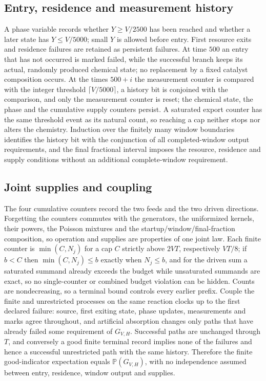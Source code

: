 \documentclass[11pt,a4paper]{article}
\theoremstyle{plain}
\theoremstyle{definition}
\theoremstyle{remark}
\newcommand{\Prob}{\mathbb P}
\newcommand{\Good}{G_{V,H}}
\begin{document}
\subsection{Entry, residence and measurement history}
A phase variable records whether $Y\ge V/2500$ has been reached and whether a later state has $Y\le V/5000$; small $Y$ is allowed before entry. First resource exits and residence failures are retained as persistent failures. At time $500$ an entry that has not occurred is marked failed, while the successful branch keeps its actual, randomly produced chemical state; no replacement by a fixed catalyst composition occurs. At the times $500+i$ the measurement counter is compared with the integer threshold $\lceil V/5000\rceil$, a history bit is conjoined with the comparison, and only the measurement counter is reset; the chemical state, the phase and the cumulative supply counters persist. A saturated export counter has the same threshold event as its natural count, so reaching a cap neither stops nor alters the chemistry. Induction over the finitely many window boundaries identifies the history bit with the conjunction of all completed-window output requirements, and the final fractional interval imposes the resource, residence and supply conditions without an additional complete-window requirement.

\subsection{Joint supplies and coupling}
The four cumulative counters record the two feeds and the two driven directions. Forgetting the counters commutes with the generators, the uniformized kernels, their powers, the Poisson mixtures and the startup/window/final-fraction composition, so operation and supplies are properties of one joint law. Each finite counter is $\min(C,N_j)$ for a cap $C$ strictly above $2VT$, respectively $VT/8$; if $b<C$ then $\min(C,N_j)\le b$ exactly when $N_j\le b$, and for the driven sum a saturated summand already exceeds the budget while unsaturated summands are exact, so no single-counter or combined budget violation can be hidden. Counts are nondecreasing, so a terminal bound controls every earlier prefix. Couple the finite and unrestricted processes on the same reaction clocks up to the first declared failure: source, first exiting state, phase updates, measurements and marks agree throughout, and artificial absorption changes only paths that have already failed some requirement of $\Good$. Successful paths are unchanged through $T$, and conversely a good finite terminal record implies none of the failures and hence a successful unrestricted path with the same history. Therefore the finite good-indicator expectation equals $\Prob(\Good)$, with no independence assumed between entry, residence, window output and supplies.
\end{document}
